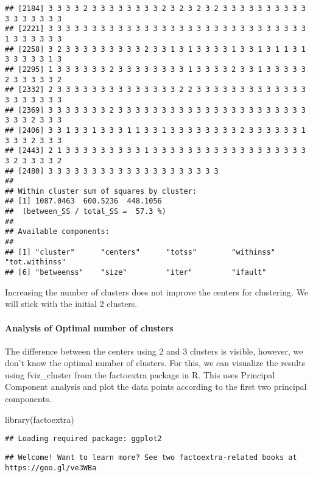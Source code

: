 \documentclass[
]{article}
\newenvironment{Shaded}{\begin{snugshade}}{\end{snugshade}}
\newcommand{\FunctionTok}[1]{\textcolor[rgb]{0.00,0.00,0.00}{#1}}
\newcommand{\NormalTok}[1]{#1}
\begin{document}
\begin{verbatim}
## [2184] 3 3 3 3 2 3 3 3 3 3 3 3 3 2 3 2 3 2 3 2 3 3 3 3 3 3 3 3 3 3 3 3 3 3 3 3 3
## [2221] 3 3 3 3 3 3 3 3 3 3 3 3 3 3 3 3 3 3 3 3 3 3 3 3 3 3 3 3 3 3 1 3 3 3 3 3 3
## [2258] 3 2 3 3 3 3 3 3 3 3 3 2 3 3 1 3 1 3 3 3 3 1 3 3 1 3 1 1 3 1 3 3 3 3 3 1 3
## [2295] 1 3 3 3 3 3 3 2 3 3 3 3 3 3 3 3 1 3 3 3 3 2 3 3 1 3 3 3 3 3 2 3 3 3 3 3 2
## [2332] 2 3 3 3 3 3 3 3 3 3 3 3 3 3 3 2 2 3 3 3 3 3 3 3 3 3 3 3 3 3 3 3 3 3 3 3 3
## [2369] 3 3 3 3 3 3 3 2 3 3 3 3 3 3 3 3 3 3 3 3 3 3 3 3 3 3 3 3 3 3 3 3 3 2 3 3 3
## [2406] 3 3 1 3 3 1 3 3 3 1 1 3 3 1 3 3 3 3 3 3 3 3 2 3 3 3 3 3 3 1 3 3 3 2 3 3 3
## [2443] 2 1 3 3 3 3 3 3 3 3 3 1 3 3 3 3 3 3 3 3 3 3 3 3 3 3 3 3 3 3 3 2 3 3 3 3 2
## [2480] 3 3 3 3 3 3 3 3 3 3 3 3 3 3 3 3 3 3 3 3
## 
## Within cluster sum of squares by cluster:
## [1] 1087.0463  600.5236  448.1056
##  (between_SS / total_SS =  57.3 %)
## 
## Available components:
## 
## [1] "cluster"      "centers"      "totss"        "withinss"     "tot.withinss"
## [6] "betweenss"    "size"         "iter"         "ifault"
\end{verbatim}

Increasing the number of clusters does not improve the centers for
clustering. We will stick with the initial 2 clusters.

\hypertarget{analysis-of-optimal-number-of-clusters}{%
\paragraph{Analysis of Optimal number of
clusters}\label{analysis-of-optimal-number-of-clusters}}

The difference between the centers using 2 and 3 clusters is visible,
however, we don't know the optimal number of clusters. For this, we can
visualize the results using fviz\_cluster from the factoextra package in
R. This uses Principal Component analysis and plot the data points
according to the first two principal components.

\begin{Shaded}
\begin{Highlighting}[]
\FunctionTok{library}\NormalTok{(factoextra)}
\end{Highlighting}
\end{Shaded}

\begin{verbatim}
## Loading required package: ggplot2
\end{verbatim}

\begin{verbatim}
## Welcome! Want to learn more? See two factoextra-related books at https://goo.gl/ve3WBa
\end{verbatim}
\end{document}
